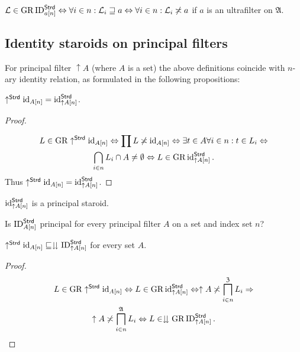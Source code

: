 \begin{obvious}
$\mathcal{L}\in\operatorname{GR}\operatorname{ID}_{a[n]}^{\mathsf{Strd}}\Leftrightarrow\forall i\in n:\mathcal{L}_{i}\sqsupseteq a\Leftrightarrow\forall i\in n:\mathcal{L}_{i}\not\asymp a$
if $a$ is an ultrafilter on $\mathfrak{A}$.
\end{obvious}

\subsection{Identity staroids on principal filters}

For principal filter $\uparrow A$ (where $A$ is a set) the above
definitions coincide with $n$-ary identity relation, as formulated
in the following propositions:
\begin{prop}
$\uparrow^{\mathsf{Strd}}\operatorname{id}_{A[n]}=\operatorname{id}_{\uparrow A[n]}^{\mathsf{Strd}}$.\end{prop}
\begin{proof}
~

\begin{multline*}
L\in\operatorname{GR}\uparrow^{\mathsf{Strd}}\operatorname{id}_{A[n]}\Leftrightarrow\prod L\not\asymp\operatorname{id}_{A[n]}\Leftrightarrow\exists t\in A\forall i\in n:t\in L_{i}\Leftrightarrow\\
\bigcap_{i\in n}L_{i}\cap A\neq\emptyset\Leftrightarrow L\in\operatorname{GR}\operatorname{id}_{\uparrow A[n]}^{\mathsf{Strd}}.
\end{multline*}
Thus $\uparrow^{\mathsf{Strd}}\operatorname{id}_{A[n]}=\operatorname{id}_{\uparrow A[n]}^{\mathsf{Strd}}$.\end{proof}
\begin{cor}
$\operatorname{id}_{\uparrow A[n]}^{\mathsf{Strd}}$ is a principal staroid.\end{cor}
\begin{question}
Is $\operatorname{ID}_{A[n]}^{\mathsf{Strd}}$ principal for every principal filter
$A$ on a set and index set $n$?\end{question}
\begin{prop}
$\uparrow^{\mathsf{Strd}}\operatorname{id}_{A[n]}\sqsubseteq\downdownarrows\operatorname{ID}_{\uparrow A[n]}^{\mathsf{Strd}}$
for every set $A$.\end{prop}
\begin{proof}
~
\begin{multline*}
L\in\operatorname{GR}\uparrow^{\mathsf{Strd}}\operatorname{id}_{A[n]}\Leftrightarrow L\in\operatorname{GR}\operatorname{id}_{\uparrow A[n]}^{\mathsf{Strd}}\Leftrightarrow\uparrow A\not\asymp\bigsqcap_{i\in n}^{\mathfrak{Z}}L_{i}\Rightarrow\\
\uparrow A\not\asymp\bigsqcap_{i\in n}^{\mathfrak{A}}L_{i}\Leftrightarrow L\in\downdownarrows\operatorname{GR}\operatorname{ID}_{\uparrow A[n]}^{\mathsf{Strd}}.
\end{multline*}
\end{proof}
